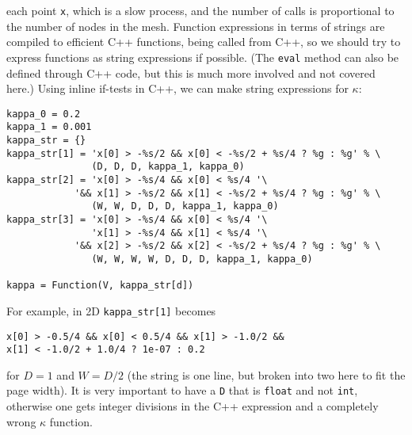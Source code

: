 each point {\fontsize{12pt}{12pt}\texttt{x}}, which is a slow process, and the number of calls
is proportional to the number of nodes in the mesh.
Function expressions in terms of strings are compiled to efficient
C++ functions, being called from C++, so we should try to express functions
as string expressions if possible. (The {\fontsize{12pt}{12pt}\texttt{eval}} method can also be
defined through C++ code, but this is much
more involved and not covered here.)
Using inline if-tests in C++, we can make string expressions for
$\kappa$:
\begin{Verbatim}[fontsize=\fontsize{10pt}{10pt},tabsize=8,baselinestretch=1.05,
fontfamily=tt,xleftmargin=7mm]
kappa_0 = 0.2
kappa_1 = 0.001
kappa_str = {}
kappa_str[1] = 'x[0] > -%s/2 && x[0] < -%s/2 + %s/4 ? %g : %g' % \
               (D, D, D, kappa_1, kappa_0)
kappa_str[2] = 'x[0] > -%s/4 && x[0] < %s/4 '\
            '&& x[1] > -%s/2 && x[1] < -%s/2 + %s/4 ? %g : %g' % \
               (W, W, D, D, D, kappa_1, kappa_0)
kappa_str[3] = 'x[0] > -%s/4 && x[0] < %s/4 '\
               'x[1] > -%s/4 && x[1] < %s/4 '\
            '&& x[2] > -%s/2 && x[2] < -%s/2 + %s/4 ? %g : %g' % \
               (W, W, W, W, D, D, D, kappa_1, kappa_0)

kappa = Function(V, kappa_str[d])
\end{Verbatim}
\noindent
For example, in 2D {\fontsize{12pt}{12pt}\verb!kappa_str[1]!} becomes
\begin{Verbatim}[fontsize=\fontsize{10pt}{10pt},tabsize=8,baselinestretch=1.05,
fontfamily=tt,xleftmargin=7mm]
x[0] > -0.5/4 && x[0] < 0.5/4 && x[1] > -1.0/2 && 
x[1] < -1.0/2 + 1.0/4 ? 1e-07 : 0.2
\end{Verbatim}
\noindent
for $D=1$ and $W=D/2$ (the string is one line, but
broken into two here to fit the page width). It is very important to have
a {\fontsize{12pt}{12pt}\texttt{D}} that is {\fontsize{12pt}{12pt}\texttt{float}} and not {\fontsize{12pt}{12pt}\texttt{int}}, otherwise one gets
integer divisions in the C++ expression and a completely wrong $\kappa$
function.

